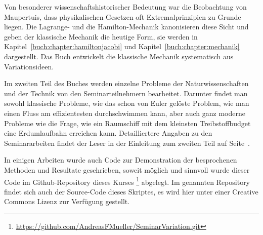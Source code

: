 Von besonderer wissenschaftshistorischer Bedeutung war die Beobachtung
von Maupertuis, dass physikalischen Gesetzen oft Extremalprinzipien zu
Grunde liegen.
Die Lagrange- und die Hamilton-Mechanik kanonisieren diese Sicht und geben
der klassische Mechanik die heutige Form, sie werden in
Kapitel~\ref{buch:chapter:hamiltonjacobi}
und
Kapitel~\ref{buch:chapter:mechanik}
dargestellt.
Das Buch \cite{buch:levi} entwickelt die klassische Mechanik systematisch
aus Variationsideen.

Im zweiten Teil des Buches werden einzelne Probleme der Naturwissenschaften
und der Technik von den Seminarteilnehmern bearbeitet.
Darunter findet man sowohl klassische Probleme, wie das schon von
Euler gelöste Problem, wie man einen Fluss am effizientesten durchschwimmen
kann, aber auch ganz moderne Probleme wie die Frage, wie ein
Raumschiff mit dem kleinsten Treibstoffbudget eine Erdumlaufbahn
erreichen kann.
Detailliertere Angaben zu den Seminararbeiten findet der Leser in der
Einleitung zum zweiten Teil auf Seite~\pageref{buch:part2:anwendungen}.

In einigen Arbeiten wurde auch Code zur Demonstration der 
besprochenen Methoden und Resultate geschrieben, soweit
möglich und sinnvoll wurde dieser Code im Github-Repository
%
dieses Kurses%
\footnote{\url{https://github.com/AndreasFMueller/SeminarVariation.git}}
\cite{buch:repo}
abgelegt.
Im genannten Repository findet sich auch der Source-Code dieses
Skriptes, es wird hier unter einer Creative Commons Lizenz
zur Verfügung gestellt.

